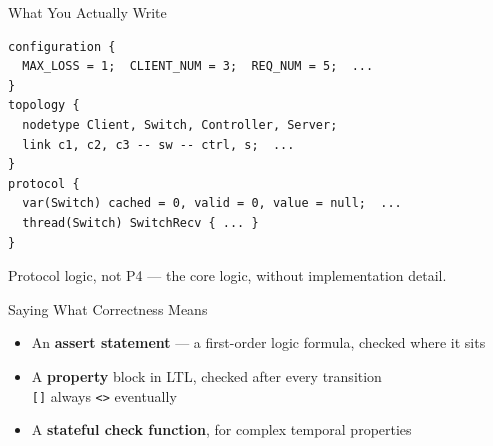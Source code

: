 \begin{frame}[fragile]{What You Actually Write}
  \vspace{0.2em}
  \begin{center}
    \begin{minipage}{0.88\textwidth}
\begin{lstlisting}[style=spec, basicstyle=\ttfamily\footnotesize]
configuration {
  MAX_LOSS = 1;  CLIENT_NUM = 3;  REQ_NUM = 5;  ...
}
topology {
  nodetype Client, Switch, Controller, Server;
  link c1, c2, c3 -- sw -- ctrl, s;  ...
}
protocol {
  var(Switch) cached = 0, valid = 0, value = null;  ...
  thread(Switch) SwitchRecv { ... }
}
\end{lstlisting}
    \end{minipage}
  \end{center}
  \vspace{0.4em}
  \begin{center}
    \alert{Protocol logic, not P4 --- the core logic, without implementation detail.}
  \end{center}
\end{frame}

\begin{frame}[fragile]{Saying What Correctness Means}
  \vspace{1.2em}
  \begin{itemize}
    \item An \textbf{assert statement} --- a first-order logic formula,
          checked where it sits
    \vspace{1.0em}
    \item A \textbf{property} block in LTL, checked after every transition\\[0.4em]
          \hspace*{1.2em}\texttt{[]} always \qquad \texttt{<>} eventually
    \vspace{1.0em}
    \item A \textbf{stateful check function}, for complex temporal properties
  \end{itemize}
\end{frame}

